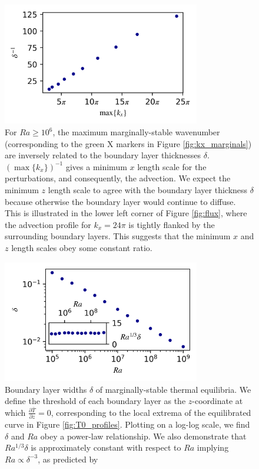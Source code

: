 \documentclass[reprint,amsmath,amssymb,aps]{revtex4-1}
\begin{document}
\begin{figure}
    \centering
    \includegraphics[width=3.4in]{del_kx_inv.png}
    \caption{For $Ra \geq 10^6$, the maximum marginally-stable wavenumber (corresponding to the green X markers in Figure \ref{fig:kx_marginals}) are inversely related to the boundary layer thicknesses $\delta$. 
    $(\max \{ k_x \})^{-1}$ gives a minimum $x$ length scale for the perturbations, and consequently, the advection. 
    We expect the minimum $z$ length scale to agree with the boundary layer thickness $\delta$ because otherwise the boundary layer would continue to diffuse. 
    This is illustrated in the lower left corner of Figure \ref{fig:flux}, where the advection profile for $k_x = 24\pi$ is tightly flanked by the surrounding boundary layers. 
    This suggests that the minimum $x$ and $z$ length scales obey some constant ratio.}
    \label{fig:del_inv}
\end{figure}

\begin{figure}
    \centering
    \includegraphics[width=3.4in]{del_ra.PNG}
    \caption{Boundary layer widths $\delta$ of marginally-stable thermal equilibria. 
    We define the threshold of each boundary layer as the $z$-coordinate at which $\frac{\partial \bar{T}}{\partial z} = 0$, corresponding to the local extrema of the equilibrated curve in Figure \ref{fig:T0_profiles}. 
    Plotting on a log-log scale, we find $\delta$ and $Ra$ obey a power-law relationship. We also demonstrate that $Ra^{1/3}\delta$ is approximately constant with respect to $Ra$ implying $Ra \propto  \delta^{-3}$, as predicted by \cite{Malkus}}
    \label{fig:bl_ra}
\end{figure}
\end{document}
